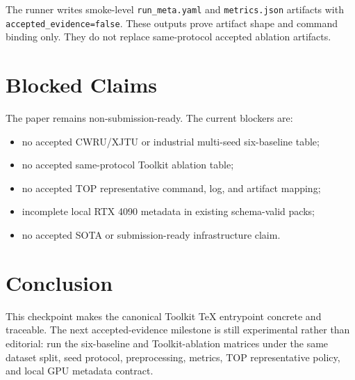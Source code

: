 \documentclass[journal]{IEEEtran}
\begin{document}
The runner writes smoke-level \texttt{run\_meta.yaml} and \texttt{metrics.json}
artifacts with \texttt{accepted\_evidence=false}. These outputs prove artifact
shape and command binding only. They do not replace same-protocol accepted
ablation artifacts.

\section{Blocked Claims}

The paper remains non-submission-ready. The current blockers are:
\begin{itemize}
  \item no accepted CWRU/XJTU or industrial multi-seed six-baseline table;
  \item no accepted same-protocol Toolkit ablation table;
  \item no accepted TOP representative command, log, and artifact mapping;
  \item incomplete local RTX 4090 metadata in existing schema-valid packs;
  \item no accepted SOTA or submission-ready infrastructure claim.
\end{itemize}

\section{Conclusion}

This checkpoint makes the canonical Toolkit TeX entrypoint concrete and
traceable. The next accepted-evidence milestone is still experimental rather
than editorial: run the six-baseline and Toolkit-ablation matrices under the
same dataset split, seed protocol, preprocessing, metrics, TOP representative
policy, and local GPU metadata contract.
\end{document}
